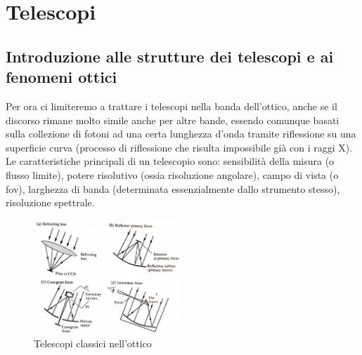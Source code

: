 \chapter{Telescopi}

\section{Introduzione alle strutture dei telescopi e ai fenomeni ottici}

Per ora ci limiteremo a trattare i telescopi nella banda dell'ottico, anche se il discorso rimane molto simile anche per altre bande, essendo comunque basati sulla collezione di fotoni ad una certa lunghezza d'onda tramite riflessione su una superficie curva (processo di riflessione che risulta impossibile già con i raggi X). Le caratteristiche principali di un telescopio sono: sensibilità della misura (o flusso limite), potere risolutivo (ossia risoluzione angolare), campo di vista (o fov), larghezza di banda (determinata essenzialmente dallo strumento stesso), risoluzione spettrale.

\begin{figure}
	\vspace{-10pt}
	\centering
	\includegraphics[width=0.49\textwidth]{./Immagini/Capitolo2/Telescopi_classici.png}
	\caption{Telescopi classici nell'ottico}
	\vspace{-10pt}
\end{figure}

